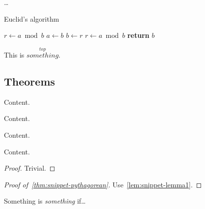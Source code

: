 {    %
    \ldots
    
    \begin{algorithm}
        \caption{Euclid's algorithm}
        \label{alg:snippet-euclid}
        \begin{algorithmic}
            \State $r\gets a\bmod b$
            \State $a\gets b$
            \State $b\gets r$
            \State $r\gets a\bmod b$
            \EndWhile\label{alg:snippet-euclidendwhile}
            \State \textbf{return} $b$
            \EndProcedure
        \end{algorithmic}
    \end{algorithm}

    This is $\overset{top}{something}$.
    
    \subsection*{Theorems}
    
    \begin{theorem}
        \label{thm:snippet-pythagorean}
        Content.
    \end{theorem}
    
    \begin{corollary}
        Content.
    \end{corollary}
    
    \begin{corollary}
        Content.
    \end{corollary}
    
    \begin{lemma}
        \label{lem:snippet-lemma1}
        Content.
    \end{lemma}
    
    \begin{proof}
        Trivial.
    \end{proof}
    
    \begin{proof}[Proof of~\autoref{thm:snippet-pythagorean}]
        Use~\autoref{lem:snippet-lemma1}.
    \end{proof}

    \begin{definition}
        Something is \textit{something} if\ldots
    \end{definition}
}

